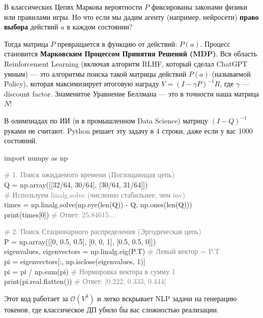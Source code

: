 \documentclass[12pt,a4paper]{article}
\begin{document}
\newpage

\begin{tcolorbox}[colback=insightteal!5, colframe=insightteal, title=\textbf{Почему это важно для ИИ? (Reinforcement Learning)}, fonttitle=\bfseries]
В классических Цепях Маркова вероятности $P$ фиксированы законами физики или правилами игры. Но что если мы дадим агенту (например, нейросети) \textbf{право выбора} действий $a$ в каждом состоянии? 

Тогда матрица $P$ превращается в функцию от действий: $P(a)$. Процесс становится \textbf{Марковским Процессом Принятия Решений (MDP)}. Вся область Reinforcement Learning (включая алгоритм RLHF, который сделал ChatGPT умным) — это алгоритмы поиска такой матрицы действий $P(a)$ (называемой Policy), которая максимизирует итоговую награду $V = (I - \gamma P)^{-1} R$, где $\gamma$ — discount factor. Знаменитое Уравнение Беллмана — это в точности наша матрица $N$!
\end{tcolorbox}

\vspace{0.4cm}
\begin{tcolorbox}[colback=codebg, colframe=defblue!80!black, title=\textbf{\texttt{/} Шпаргалка ML-Разработчика: Цепи Маркова в NumPy}, fonttitle=\bfseries\sffamily, boxrule=1pt]
В олимпиадах по ИИ (и в промышленном Data Science) матрицу $(I-Q)^{-1}$ руками не считают. Python решает эту задачу в 4 строки, даже если у вас 1000 состояний.
\vspace{0.2cm}

\selectfont
\textcolor{thmred}{import} numpy \textcolor{thmred}{as} np

\textcolor{gray}{\# 1. Поиск ожидаемого времени (Поглощающая цепь)}\\
Q = np.array([[32/64, 30/64], [30/64, 31/64]])\\
\textcolor{gray}{\# Используем linalg.solve (численно стабильнее, чем inv)}\\
times = np.linalg.solve(np.eye(\textcolor{thmred}{len}(Q)) - Q, np.ones(\textcolor{thmred}{len}(Q)))\\
\textcolor{thmred}{print}(times[0]) \textcolor{gray}{\# Ответ: 25.84615...}

\vspace{0.2cm}
\textcolor{gray}{\# 2. Поиск Стационарного распределения (Эргодическая цепь)}\\
P = np.array([[0, 0.5, 0.5], [0, 0, 1], [0.5, 0.5, 0]])\\
eigenvalues, eigenvectors = np.linalg.eig(P.T) \textcolor{gray}{\# Левый вектор = P.T}\\
pi = eigenvectors[:, np.isclose(eigenvalues, 1)]\\
pi = pi / np.sum(pi) \textcolor{gray}{\# Нормировка вектора в сумму 1}\\
\textcolor{thmred}{print}(pi.real.flatten()) \textcolor{gray}{\# Ответ: [0.222, 0.333, 0.444]}
\normalfont
\vspace{0.2cm}

Этот код работает за $\mathcal{O}(V^3)$ и легко вскрывает NLP задачи на генерацию токенов, где классическое ДП убило бы вас сложностью реализации.
\end{tcolorbox}
\end{document}
